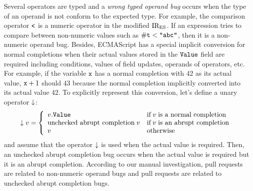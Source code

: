 Several operators are typed and a \textit{wrong typed operand bug} occurs when
the type of an operand is not conform to the expected type.  For example, the
comparison operator $\texttt{<}$ is a numeric operator in the modified ${\text{IR}_\text{ES}}$.  If
an expression tries to compare between non-numeric values such as $\mathtt{\#t} <
\texttt{"abc"}$, then it is a non-numeric operand bug.  Besides, ECMAScript has a
special implicit conversion for normal completions when their actual values
stored in the $\texttt{Value}$ field are required including conditions, values of
field updates, operands of operators, etc.  For example, if the variable $\texttt{x}$
has a normal completion with 42 as its actual value, $\texttt{x} + 1$ should 43 because
the normal completion implicitly converted into its actual value 42.  To
explicitly represent this conversion, let's define a unary operator $\downarrow$:
\[
  \downarrow v = \left\{
    \begin{array}{ll}
      v.\texttt{Value} &
      \text{if} \; v \; \text{is a normal completion}\\

      \text{unchecked abrupt completion} \; v &
      \text{if} \; v \; \text{is an abrupt completion}\\

      v &
      \text{otherwise}\\
    \end{array}
  \right.
\]
and assume that the operator $\downarrow$ is used when the actual value is
required.  Then, an unchecked abrupt completion bug occurs when the actual value
is required but it is an abrupt completion.  According to our manual
investigation,  pull requests are related to  non-numeric
operand bugs and  pull requests are related to  unchecked
abrupt completion bugs.

